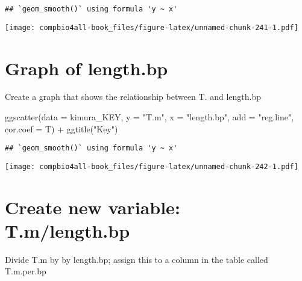 \documentclass[
]{book}
\newenvironment{Shaded}{\begin{snugshade}}{\end{snugshade}}
\newcommand{\AttributeTok}[1]{\textcolor[rgb]{0.77,0.63,0.00}{#1}}
\newcommand{\CommentTok}[1]{\textcolor[rgb]{0.56,0.35,0.01}{\textit{#1}}}
\newcommand{\FunctionTok}[1]{\textcolor[rgb]{0.00,0.00,0.00}{#1}}
\newcommand{\NormalTok}[1]{#1}
\newcommand{\OtherTok}[1]{\textcolor[rgb]{0.56,0.35,0.01}{#1}}
\newcommand{\SpecialCharTok}[1]{\textcolor[rgb]{0.00,0.00,0.00}{#1}}
\newcommand{\StringTok}[1]{\textcolor[rgb]{0.31,0.60,0.02}{#1}}
\begin{document}
\begin{verbatim}
## `geom_smooth()` using formula 'y ~ x'
\end{verbatim}

\texttt{[image: compbio4all-book\_files/figure-latex/unnamed-chunk-241-1.pdf]}

\hypertarget{graph-of-length.bp}{%
\section{Graph of length.bp}\label{graph-of-length.bp}}

Create a graph that shows the relationship between T. and length.bp

\begin{Shaded}
\begin{Highlighting}[]
\FunctionTok{ggscatter}\NormalTok{(}\AttributeTok{data =}\NormalTok{ kimura\_KEY,}
         \AttributeTok{y =} \StringTok{"T.m"}\NormalTok{,}
         \AttributeTok{x =} \StringTok{"length.bp"}\NormalTok{,}
         \AttributeTok{add =} \StringTok{"reg.line"}\NormalTok{,}
         \AttributeTok{cor.coef =}\NormalTok{ T) }\SpecialCharTok{+} 
  \FunctionTok{ggtitle}\NormalTok{(}\StringTok{"Key"}\NormalTok{)}
\end{Highlighting}
\end{Shaded}

\begin{verbatim}
## `geom_smooth()` using formula 'y ~ x'
\end{verbatim}

\texttt{[image: compbio4all-book\_files/figure-latex/unnamed-chunk-242-1.pdf]}

\hypertarget{create-new-variable-t.mlength.bp}{%
\section{Create new variable: T.m/length.bp}\label{create-new-variable-t.mlength.bp}}

Divide T.m by by length.bp; assign this to a column in the table called T.m.per.bp

\begin{Shaded}
\end{Shaded}
\end{document}
